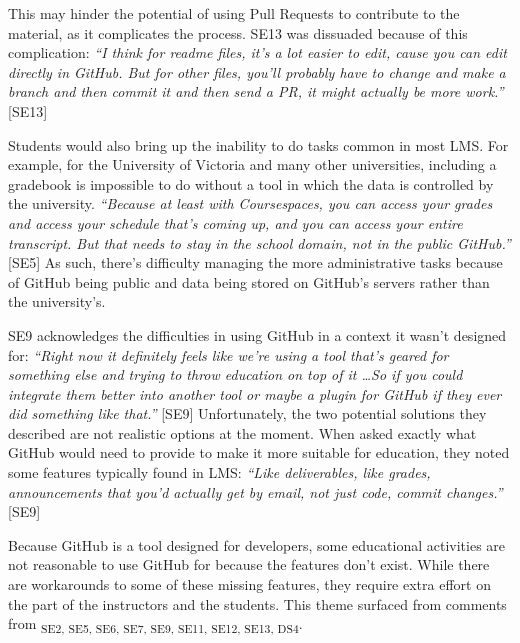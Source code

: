 This may hinder the potential of using Pull Requests to contribute to the material, as it complicates the process. SE13 was dissuaded because of this complication: \textit{``I think for readme files, it's a lot easier to edit, cause you can edit directly in GitHub. But for other files, you'll probably have to change and make a branch and then commit it and then send a PR, it might actually be more work.''} [SE13]

Students would also bring up the inability to do tasks common in most LMS. For example, for the University of Victoria and many other universities, including a gradebook is impossible to do without a tool in which the data is controlled by the university. \textit{``Because at least with Coursespaces, you can access your grades and access your schedule that's coming up, and you can access your entire transcript. But that needs to stay in the school domain, not in the public GitHub.''} [SE5] As such, there's difficulty managing the more administrative tasks because of GitHub being public and data being stored on GitHub's servers rather than the university's.


SE9 acknowledges the difficulties in using GitHub in a context it wasn't designed for: \textit{``Right now it definitely feels like we're using a tool that's geared for something else and trying to throw education on top of it \ldots So if you could integrate them better into another tool or maybe a plugin for GitHub if they ever did something like that.''} [SE9] Unfortunately, the two potential solutions they described are not realistic options at the moment. When asked exactly what GitHub would need to provide to make it more suitable for education, they noted some features typically found in LMS: \textit{``Like deliverables, like grades, announcements that you'd actually get by email, not just code, commit changes.''} [SE9]

Because GitHub is a tool designed for developers, some educational activities are not reasonable to use GitHub for because the features don't exist. While there are workarounds to some of these missing features, they require extra effort on the part of the instructors and the students. This theme surfaced from comments from \textsubscript{SE2, SE5, SE6, SE7, SE9, SE11, SE12, SE13, DS4}.


